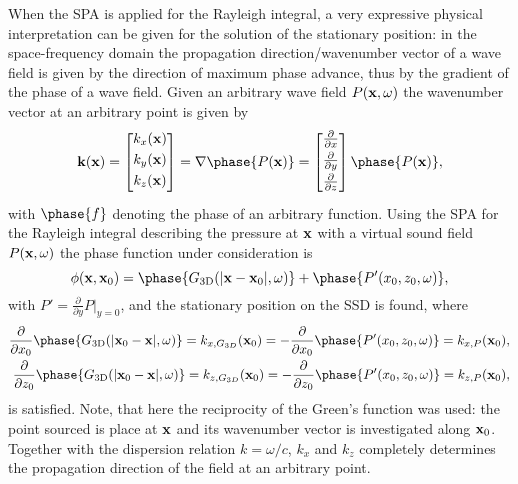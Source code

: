 When the SPA is applied for the Rayleigh integral, a very expressive physical interpretation can be given for the solution of the stationary position:
in the space-frequency domain the propagation direction/wavenumber vector of a wave field is given by the direction of maximum phase advance, thus by the gradient of the phase of a wave field. Given an arbitrary wave field $P(\mathbf{x},\omega)$ the wavenumber vector at an arbitrary point is given by
\begin{equation}
\mathbf{k}(\vx) = \begin{bmatrix} k_x(\vx) \\[0.3em] k_y(\vx)\\[0.3em]  k_z(\vx)\\[0.3em] \end{bmatrix} = \nabla \phase{P(\vx)} = \begin{bmatrix} \frac{\partial}{\partial x} \\[0.3em] \frac{\partial}{\partial y}\\[0.3em]
\frac{\partial}{\partial z}\\[0.3em] \end{bmatrix}   \phase{P(\vx)},
\end{equation}
with $\phase{f}$ denoting the phase of an arbitrary function.
Using the SPA for the Rayleigh integral describing the pressure at $\mathbf{x}$ with a virtual sound field $P(\mathbf{x},\omega)$ the phase function under consideration is 
\begin{equation}
\phi(\vx,\vxo) =  \phase{G_{\mathrm{3D}}(|\vx-\vxo|,\omega)} + \phase{ P'(x_0,z_0,\omega)},
\end{equation}
with $P' =  \frac{\partial}{\partial y}P|_{y = 0} $,
and the stationary position on the SSD is found, where 
\begin{eqnarray}
\frac{ \partial }{\partial x_0} \phase{G_{\mathrm{3D}}(|\vxo-\vx|,\omega)} = k_{x,G_{3D}}(\vxo) =  - \frac{ \partial }{\partial x_0} \phase{ P'(x_0,z_0,\omega) } =  k_{x,P}(\vxo) ,
\\
\frac{ \partial }{\partial z_0} \phase{G_{\mathrm{3D}}(|\vxo-\vx|,\omega)} =  k_{z,G_{3D}}(\vxo) = - \frac{ \partial }{\partial z_0} \phase{ P'(x_0,z_0,\omega) } =  k_{z,P}(\vxo),
\end{eqnarray}
is satisfied. Note, that here the reciprocity of the Green's function was used: the point sourced is place at $\mathbf{x}$ and its wavenumber vector is investigated along $\mathbf{x}_0$.
Together with the dispersion relation $k = \omega/c$, $k_x$ and $k_z$ completely determines the propagation direction of the field at an arbitrary point.
